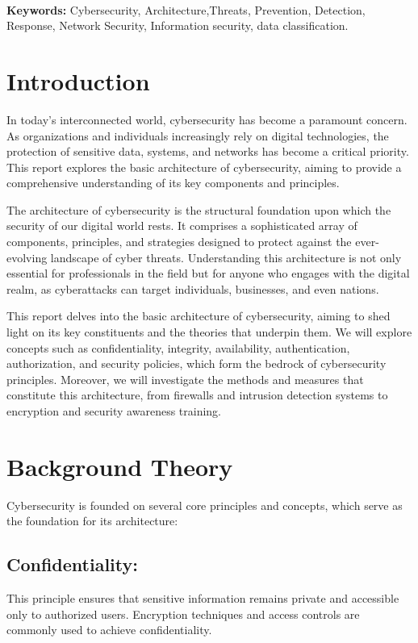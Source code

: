 \documentclass[12pt]{report}
\begin{document}
\textbf{\\Keywords:} Cybersecurity, Architecture,Threats, Prevention, Detection, Response, Network Security, Information security, data classification.

\newpage
\section*{Introduction}
In today's interconnected world, cybersecurity has become a paramount concern. As organizations and individuals increasingly rely on digital technologies, the protection of sensitive data, systems, and networks has become a critical priority. This report explores the basic architecture of cybersecurity, aiming to provide a comprehensive understanding of its key components and principles.\cite{information}

The architecture of cybersecurity is the structural foundation upon which the security of our digital world rests. It comprises a sophisticated array of components, principles, and strategies designed to protect against the ever-evolving landscape of cyber threats. Understanding this architecture is not only essential for professionals in the field but for anyone who engages with the digital realm, as cyberattacks can target individuals, businesses, and even nations.\cite{cyber}

This report delves into the basic architecture of cybersecurity, aiming to shed light on its key constituents and the theories that underpin them. We will explore concepts such as confidentiality, integrity, availability, authentication, authorization, and security policies, which form the bedrock of cybersecurity principles. Moreover, we will investigate the methods and measures that constitute this architecture, from firewalls and intrusion detection systems to encryption and security awareness training.



\newpage
\section*{Background Theory}
Cybersecurity\cite{ChatGPT} is founded on several core principles and concepts, which serve as the foundation for its architecture:
\subsection*{Confidentiality:}  This principle ensures that sensitive information remains private and accessible only to authorized users. Encryption techniques and access controls are commonly used to achieve confidentiality.
\end{document}

